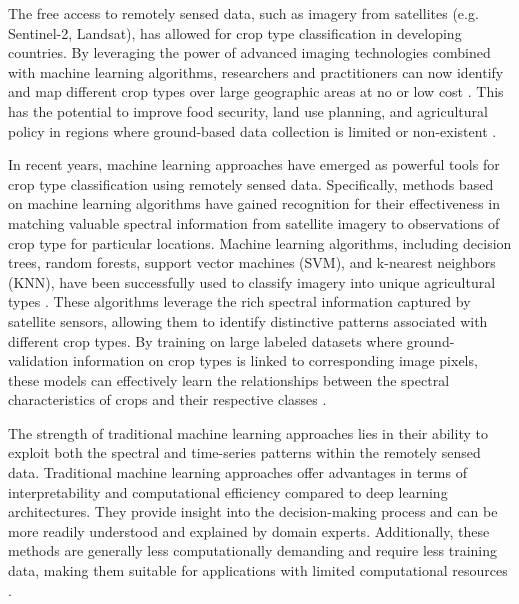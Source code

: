 \documentclass[journal]{IEEEtran}
\begin{document}
The free access to remotely sensed data, such as imagery from satellites (e.g. Sentinel-2, Landsat), has allowed for crop type classification in developing countries. By leveraging the power of advanced imaging technologies combined with machine learning algorithms, researchers and practitioners can now identify and map different crop types over large geographic areas at no or low cost \cite{hersh2021open}. This has the potential to improve food security, land use planning, and agricultural policy in regions where ground-based data collection is limited or non-existent \cite{rs10010099, li2023development, ibrahim2021mapping}.

In recent years, machine learning approaches have emerged as powerful tools for crop type classification using remotely sensed data. Specifically, methods based on machine learning algorithms have gained recognition for their effectiveness in matching valuable spectral information from satellite imagery to observations of crop type for particular locations. Machine learning algorithms, including decision trees, random forests, support vector machines (SVM), and k-nearest neighbors (KNN), have been successfully used to  classify imagery into unique agricultural types \cite{ibrahim2021mapping, begue2018remote, delince2017handbook}. These algorithms leverage the rich spectral information captured by satellite sensors, allowing them to identify distinctive patterns associated with different crop types. By training on large labeled datasets where ground-validation information on crop types is linked to corresponding image pixels, these models can effectively learn the relationships between the spectral characteristics of crops and their respective classes \cite{rs10010099}.

The strength of traditional machine learning approaches lies in their ability to exploit both the spectral and time-series patterns within the remotely sensed data. Traditional machine learning approaches offer advantages in terms of interpretability and computational efficiency compared to deep learning architectures. They provide insight into the decision-making process and can be more readily understood and explained by domain experts. Additionally, these methods are generally less computationally demanding and require less training data, making them suitable for applications with limited computational resources \cite{hohl2024recent, rs13132591, agriculture13050965, LI2023103345, MA2019166}.
 
\end{document}
